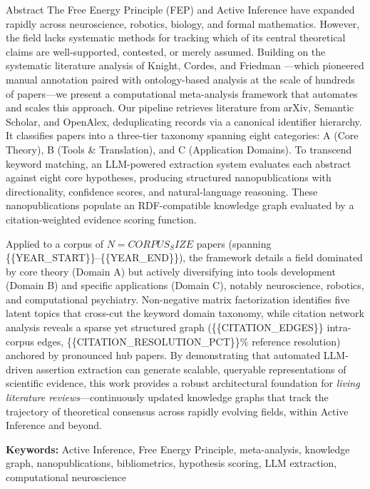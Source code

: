 \documentclass[
  ignorenonframetext,
]{beamer}
\author{\texorpdfstring{}{}}
\date{}
\begin{document}
\begin{frame}{Abstract}
\protect{}\label{abstract}
The Free Energy Principle (FEP) and Active Inference have expanded
rapidly across neuroscience, robotics, biology, and formal mathematics.
However, the field lacks systematic methods for tracking which of its
central theoretical claims are well-supported, contested, or merely
assumed. Building on the systematic literature analysis of Knight,
Cordes, and Friedman \citep{knight2022fep}---which pioneered manual
annotation paired with ontology-based analysis at the scale of hundreds
of papers---we present a computational meta-analysis framework that
automates and scales this approach. Our pipeline retrieves literature
from arXiv, Semantic Scholar, and OpenAlex, deduplicating records via a
canonical identifier hierarchy. It classifies papers into a three-tier
taxonomy spanning eight categories: A (Core Theory), B (Tools \&
Translation), and C (Application Domains). To transcend keyword
matching, an LLM-powered extraction system evaluates each abstract
against eight core hypotheses, producing structured nanopublications
with directionality, confidence scores, and natural-language reasoning.
These nanopublications populate an RDF-compatible knowledge graph
evaluated by a citation-weighted evidence scoring function.

Applied to a corpus of \(N = {{CORPUS_SIZE}}\) papers (spanning
\{\{YEAR\_START\}\}--\{\{YEAR\_END\}\}), the framework details a field
dominated by core theory (Domain A) but actively diversifying into tools
development (Domain B) and specific applications (Domain C), notably
neuroscience, robotics, and computational psychiatry. Non-negative
matrix factorization identifies five latent topics that cross-cut the
keyword domain taxonomy, while citation network analysis reveals a
sparse yet structured graph (\{\{CITATION\_EDGES\}\} intra-corpus edges,
\{\{CITATION\_RESOLUTION\_PCT\}\}\% reference resolution) anchored by
pronounced hub papers. By demonstrating that automated LLM-driven
assertion extraction can generate scalable, queryable representations of
scientific evidence, this work provides a robust architectural
foundation for \emph{living literature reviews}---continuously updated
knowledge graphs that track the trajectory of theoretical consensus
across rapidly evolving fields, within Active Inference and beyond.

\textbf{Keywords:} Active Inference, Free Energy Principle,
meta-analysis, knowledge graph, nanopublications, bibliometrics,
hypothesis scoring, LLM extraction, computational neuroscience
\end{frame}
\end{document}
